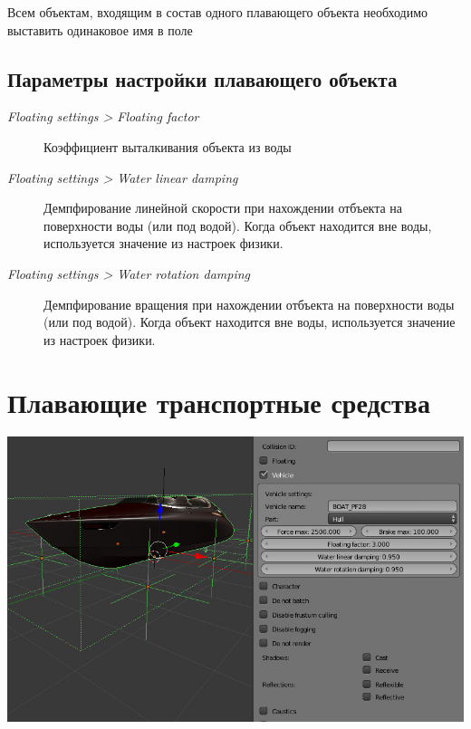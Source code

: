 \documentclass[a4paper,12pt,oneside]{sphinxmanual}
\begin{document}
Всем объектам, входящим в состав одного плавающего объекта необходимо выставить одинаковое имя в поле 


\subsection{Параметры настройки плавающего объекта}
\label{physics:id8}\begin{description}
\item[{\emph{Floating settings \textgreater{} Floating factor}}] \leavevmode
Коэффициент выталкивания объекта из воды

\item[{\emph{Floating settings \textgreater{} Water linear damping}}] \leavevmode
Демпфирование линейной скорости при нахождении отбъекта на поверхности воды (или под водой). Когда объект находится вне воды, используется значение из настроек физики.

\item[{\emph{Floating settings \textgreater{} Water rotation damping}}] \leavevmode
Демпфирование вращения при нахождении отбъекта на поверхности воды (или под водой). Когда объект находится вне воды, используется значение из настроек физики.

\end{description}


\section{Плавающие транспортные средства}
\label{physics:id9}
\includegraphics[width=1.000\linewidth]{physics_boat.jpg}

\begin{DUlineblock}{0em}
\item[] 
\end{DUlineblock}
\end{document}
